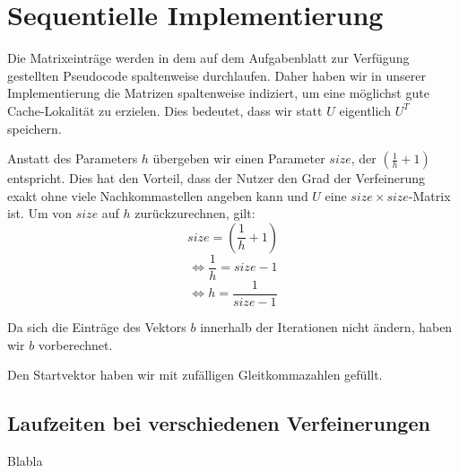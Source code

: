 \documentclass{article}
\begin{document}
\section{Sequentielle Implementierung}

Die Matrixeinträge werden in dem auf dem Aufgabenblatt zur Verfügung gestellten Pseudocode spaltenweise durchlaufen. Daher haben wir in unserer Implementierung die Matrizen spaltenweise indiziert, um eine möglichst gute Cache-Lokalität zu erzielen. Dies bedeutet, dass wir statt $U$ eigentlich $U^T$ speichern.

Anstatt des Parameters $h$ übergeben wir einen Parameter $size$, der $\left(\frac{1}{h}+1\right)$ entspricht. Dies hat den Vorteil, dass der Nutzer den Grad der Verfeinerung exakt ohne viele Nachkommastellen angeben kann und $U$ eine $size \times size$-Matrix ist.
Um von $size$ auf $h$ zurückzurechnen, gilt:
$$size = \left(\frac{1}{h} + 1\right)$$
$$\Leftrightarrow \frac{1}{h} = size - 1$$
$$\Leftrightarrow h = \frac{1}{size - 1}$$
 
Da sich die Einträge des Vektors $b$ innerhalb der Iterationen nicht ändern, haben wir $b$ vorberechnet.

Den Startvektor haben wir mit zufälligen Gleitkommazahlen gefüllt.

\subsection{Laufzeiten bei verschiedenen Verfeinerungen}
Blabla
\end{document}
